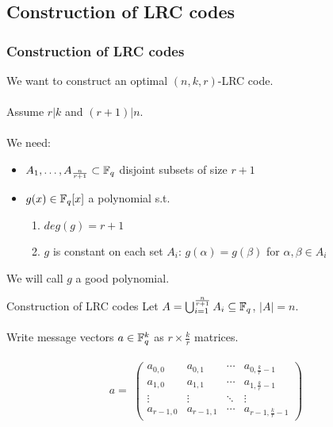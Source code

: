 \subsection{Construction of LRC codes}

\begin{frame}
        \frametitle{Construction of LRC codes}
        We want to construct an optimal $(n,k,r)$-LRC code. \\~\\
        
        Assume $r \vert k$ and $(r+1) \vert n$. \\~\\
        
        We need:
        
        \begin{itemize}
            \item $A_1 , \dots , A_{\frac{n}{r+1}} \subset \mathbb{F}_q$ disjoint subsets of size $r+1$
            \item $g(x) \in \mathbb{F}_q[x]$ a polynomial s.t.
            \begin{enumerate}
                \item $deg(g) = r+1$
                \item $g$ is constant on each set $A_i$: $g(\alpha) = g(\beta)$ for $\alpha, \beta \in A_i$
            \end{enumerate}
        \end{itemize}                
        We will call $g$ a good polynomial.
        
    \end{frame}
    
    \begin{frame}{Construction of LRC codes}
        Let $A= \bigcup_{i=1}^{\frac{n}{r+1}} A_i \subseteq \mathbb{F}_q$, $\vert A \vert = n$. \\~\\
        
        Write message vectors $a \in \mathbb{F}_q^k$ as $r \times \frac{k}{r}$ matrices. \\~\\
        
        $$ a = \;
        \begin{pmatrix}
            a_{0,0} & a_{0,1} & \cdots & a_{0,\frac{k}{r}-1} \\
            a_{1,0} & a_{1,1} & \cdots & a_{1,\frac{k}{r}-1} \\
            \vdots  & \vdots  & \ddots & \vdots \\
            a_{r-1,0} & a_{r-1,1} & \cdots & a_{r-1,\frac{k}{r}-1}
        \end{pmatrix}
        $$
    \end{frame}
    
